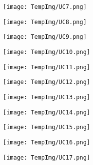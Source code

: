 \documentclass[fontsize=11pt]{extarticle}
\numberwithin{figure}{section} %
\numberwithin{table}{section}%
\begin{document}
\begin{figure}[H]
      \centering
      \texttt{[image: TempImg/UC7.png]}
 \end{figure}

\begin{figure}[H]
      \centering
      \texttt{[image: TempImg/UC8.png]}
 \end{figure}

\begin{figure}[H]
      \centering
      \texttt{[image: TempImg/UC9.png]}
 \end{figure}

\begin{figure}[H]
      \centering
      \texttt{[image: TempImg/UC10.png]}
 \end{figure}

\begin{figure}[H]
      \centering
      \texttt{[image: TempImg/UC11.png]}
 \end{figure}

\begin{figure}[H]
      \centering
      \texttt{[image: TempImg/UC12.png]}
 \end{figure}

\begin{figure}[H]
      \centering
      \texttt{[image: TempImg/UC13.png]}
 \end{figure}

\begin{figure}[H]
      \centering
      \texttt{[image: TempImg/UC14.png]}
 \end{figure}

\begin{figure}[H]
      \centering
      \texttt{[image: TempImg/UC15.png]}
 \end{figure}

\begin{figure}[H]
      \centering
      \texttt{[image: TempImg/UC16.png]}
 \end{figure}

\begin{figure}[H]
      \centering
      \texttt{[image: TempImg/UC17.png]}
 \end{figure}
\end{document}
